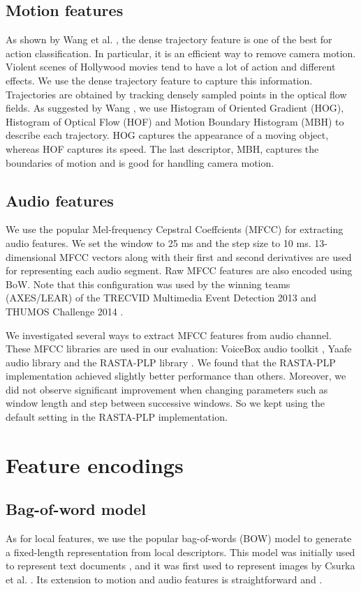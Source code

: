 \subsection{Motion features}
As shown by Wang et al. \cite{wang2013action}, the dense trajectory feature is one of the best for action classification. In particular, it is an efficient way to remove camera motion. Violent scenes of Hollywood movies tend to have a lot of action and different effects. We use the dense trajectory feature to capture this information. Trajectories are obtained by tracking densely sampled points in the optical flow fields. As suggested by Wang \cite{wang2013action}, we use Histogram of Oriented Gradient (HOG), Histogram of Optical Flow (HOF) and Motion Boundary Histogram (MBH) to describe each trajectory. HOG captures the appearance of a moving object, whereas HOF captures its speed. The last descriptor, MBH, captures the boundaries of motion and is good for handling camera motion.

\subsection{Audio features}
We use the popular Mel-frequency Cepstral Coeffcients (MFCC) \cite{rabiner2007introduction} for extracting audio features. We set the window to 25 ms and the step size to 10 ms. 13-dimensional MFCC vectors along with their first and second derivatives are used for representing each audio segment. Raw MFCC features are also encoded using BoW. Note that this configuration was used by the winning teams (AXES/LEAR) of the TRECVID Multimedia Event Detection 2013 \cite{aly2013axes} and THUMOS Challenge 2014 \cite{oneata2014lear}.

We investigated several ways to extract MFCC features from audio channel. These MFCC libraries are used in our evaluation: VoiceBox audio toolkit \cite{voicebox}, Yaafe audio library \cite{mathieu2010yaafe} and the RASTA-PLP library \cite{Ellis05-rastamat}. We found that the RASTA-PLP implementation achieved slightly better performance than others. Moreover, we did not observe significant improvement when changing parameters such as window length and step between successive windows. So we kept using the default setting in the RASTA-PLP implementation.


\section{Feature encodings}
\subsection{Bag-of-word model}
As for local features, we use the popular bag-of-words (BOW) model to generate a fixed-length representation from local descriptors. This model was initially used to represent text documents \cite{harris1954distributional}, and it was first used to represent images by Csurka et al. \cite{csurka2004visual}. Its extension to motion and audio features is straightforward \cite{sivic2009efficient} and \cite{jiang2010columbia}.

